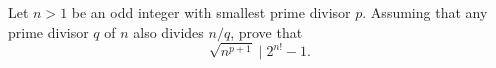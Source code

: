 Let $n > 1$ be an odd integer with smallest prime divisor $p$.
Assuming that any prime divisor $q$ of $n$ also divides $n/q$, prove that
$$\sqrt{n^{p+1}}\mid 2^{n!}-1.$$
